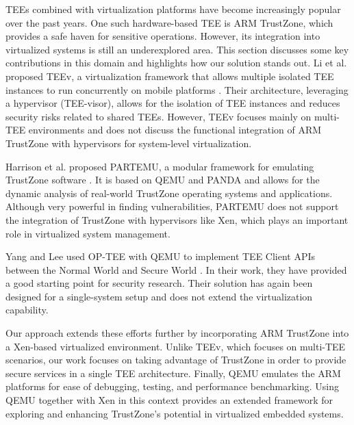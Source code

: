 \documentclass[acmtog]{acmart}
\begin{document}
TEEs combined with virtualization platforms have become increasingly popular over the past years. One such hardware-based TEE is ARM TrustZone, which provides a safe haven for sensitive operations. However, its integration into virtualized systems is still an underexplored area. This section discusses some key contributions in this domain and highlights how our solution stands out.
Li et al. proposed TEEv, a virtualization framework that allows multiple isolated TEE instances to run concurrently on mobile platforms \cite{10.1145/3313808.3313810}. Their architecture, leveraging a hypervisor (TEE-visor), allows for the isolation of TEE instances and reduces security risks related to shared TEEs. However, TEEv focuses mainly on multi-TEE environments and does not discuss the functional integration of ARM TrustZone with hypervisors for system-level virtualization.\cite{7005255} \cite{10.1007/978-3-642-32298-3_1}

Harrison et al. proposed PARTEMU, a modular framework for emulating TrustZone software \cite{247658}. It is based on QEMU and PANDA and allows for the dynamic analysis of real-world TrustZone operating systems and applications. Although very powerful in finding vulnerabilities, PARTEMU does not support the integration of TrustZone with hypervisors like Xen, which plays an important role in virtualized system management.

Yang and Lee used OP-TEE with QEMU to implement TEE Client APIs between the Normal World and Secure World \cite{10.1145/3426020.3426113}. In their work, they have provided a good starting point for security research. Their solution has again been designed for a single-system setup and does not extend the virtualization capability.\cite{10274941} \cite{10.1145/3426020.3426113} \cite{8352425}

Our approach extends these efforts further by incorporating ARM TrustZone into a Xen-based virtualized environment. Unlike TEEv, which focuses on multi-TEE scenarios, our work focuses on taking advantage of TrustZone in order to provide secure services in a single TEE architecture. Finally, QEMU emulates the ARM platforms for ease of debugging, testing, and performance benchmarking. Using QEMU together with Xen in this context provides an extended framework for exploring and enhancing TrustZone's potential in virtualized embedded systems.
\end{document}
